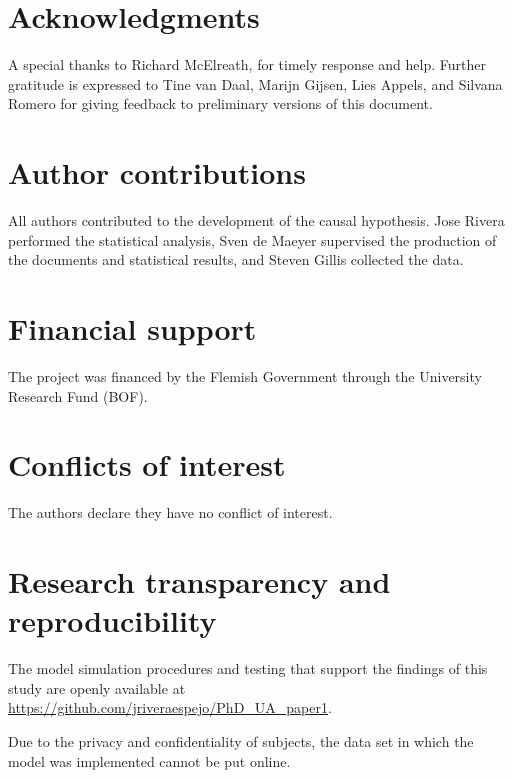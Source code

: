 \section{Acknowledgments}
%
A special thanks to Richard McElreath, for timely response and help. Further gratitude is expressed to Tine van Daal, Marijn Gijsen, Lies Appels, and Silvana Romero for giving feedback to preliminary versions of this document.
%
%
\section{Author contributions}
All authors contributed to the development of the causal hypothesis. Jose Rivera performed the statistical analysis, Sven de Maeyer supervised the production of the documents and statistical results, and Steven Gillis collected the data.
%
%
\section{Financial support}
%
The project was financed by the Flemish Government through the University Research Fund (BOF).
%
%
\section{Conflicts of interest}
The authors declare they have no conflict of interest.
%
%
\section{Research transparency and reproducibility}
The model simulation procedures and testing that support the findings of this study are openly available at \url{https://github.com/jriveraespejo/PhD_UA_paper1}.

Due to the privacy and confidentiality of subjects, the data set in which the model was implemented cannot be put online.
%
%